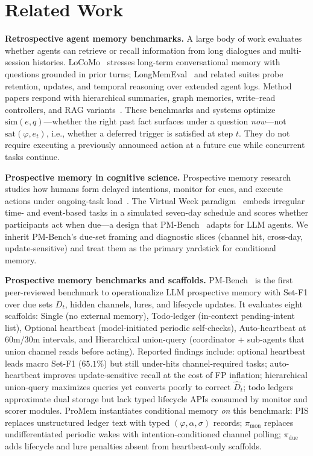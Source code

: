 \section{Related Work}

\noindent\textbf{Retrospective agent memory benchmarks.}
A large body of work evaluates whether agents can retrieve or recall information from long dialogues and multi-session histories. LoCoMo~\cite{locomo2024} stresses long-term conversational memory with questions grounded in prior turns; LongMemEval~\cite{longmemeval2024} and related suites probe retention, updates, and temporal reasoning over extended agent logs. Method papers respond with hierarchical summaries, graph memories, write--read controllers, and RAG variants~\cite{amem2025,memorybank2023,memgpt2023}. These benchmarks and systems optimize $\mathrm{sim}(e,q)$---whether the right past fact surfaces under a question \emph{now}---not $\mathrm{sat}(\varphi,e_t)$, i.e., whether a deferred trigger is satisfied at step $t$. They do not require executing a previously announced action at a future cue while concurrent tasks continue.

\noindent\textbf{Prospective memory in cognitive science.}
Prospective memory research studies how humans form delayed intentions, monitor for cues, and execute actions under ongoing-task load~\cite{einstein2005prospective,smith2003demand}. The Virtual Week paradigm~\cite{rendell2000virtual} embeds irregular time- and event-based tasks in a simulated seven-day schedule and scores whether participants act when due---a design that PM-Bench~\cite{pmbench2026} adapts for LLM agents. We inherit PM-Bench's due-set framing and diagnostic slices (channel hit, cross-day, update-sensitive) and treat them as the primary yardstick for conditional memory.

\noindent\textbf{Prospective memory benchmarks and scaffolds.}
PM-Bench~\cite{pmbench2026} is the first peer-reviewed benchmark to operationalize LLM prospective memory with Set-F1 over due sets $D_t$, hidden channels, lures, and lifecycle updates. It evaluates eight scaffolds: Single (no external memory), Todo-ledger (in-context pending-intent list), Optional heartbeat (model-initiated periodic self-checks), Auto-heartbeat at 60m/30m intervals, and Hierarchical union-query (coordinator + sub-agents that union channel reads before acting). Reported findings include: optional heartbeat leads macro Set-F1 ($65.1\%$) but still under-hits channel-required tasks; auto-heartbeat improves update-sensitive recall at the cost of FP inflation; hierarchical union-query maximizes queries yet converts poorly to correct $\hat{D}_t$; todo ledgers approximate dual storage but lack typed lifecycle APIs consumed by monitor and scorer modules. ProMem instantiates conditional memory \emph{on} this benchmark: PIS replaces unstructured ledger text with typed $(\varphi,\alpha,\sigma)$ records; $\pi_{\mathrm{mon}}$ replaces undifferentiated periodic wakes with intention-conditioned channel polling; $\pi_{\mathrm{due}}$ adds lifecycle and lure penalties absent from heartbeat-only scaffolds.

